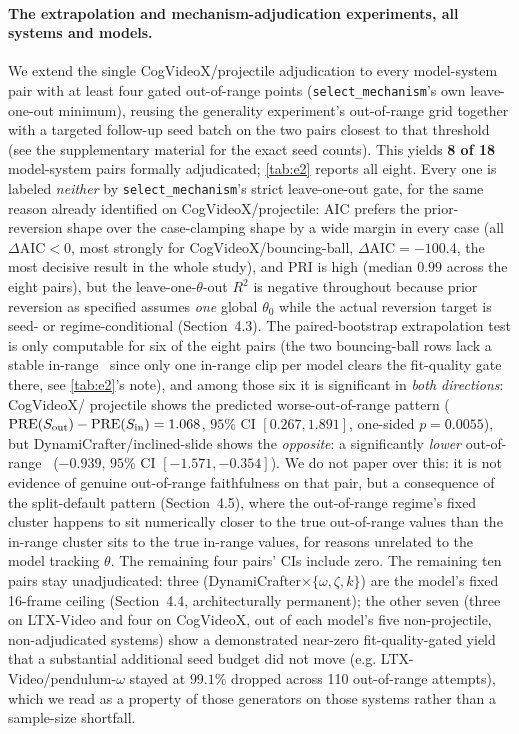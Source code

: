 \documentclass[10pt,twocolumn,letterpaper]{article}
\begin{document}
\paragraph{The extrapolation and mechanism-adjudication experiments, all systems and
models.}
We extend the single CogVideoX/projectile adjudication to every model-system
pair with at least four gated out-of-range points (\texttt{select\_mechanism}'s
own leave-one-out minimum), reusing the generality experiment's out-of-range grid together with a
targeted follow-up seed batch on the two pairs closest to that threshold
(see the supplementary material for the exact seed counts). This yields
\textbf{8 of 18} model-system pairs formally adjudicated; \autoref{tab:e2}
reports all eight. Every one is labeled \emph{neither} by
\texttt{select\_mechanism}'s strict leave-one-out gate, for the same reason
already identified on CogVideoX/projectile: AIC prefers the prior-reversion
shape over the case-clamping shape by a wide margin in every case (all
$\Delta\mathrm{AIC}<0$, most strongly for CogVideoX/bouncing-ball,
$\Delta\mathrm{AIC}=-100.4$, the most decisive result in the whole study),
and PRI is high (median $0.99$ across the eight pairs), but the
leave-one-$\theta$-out $R^2$ is negative throughout because prior reversion as specified
assumes \emph{one} global $\theta_0$ while the actual reversion target is
seed- or regime-conditional (Section~4.3). The paired-bootstrap
extrapolation test is only computable for six of the eight pairs (the two
bouncing-ball rows lack a stable in-range \PRE\ since only one in-range clip
per model clears the fit-quality gate there, see \autoref{tab:e2}'s note),
and among those six it is significant in \emph{both directions}: CogVideoX/
projectile shows the predicted worse-out-of-range pattern
($\mathrm{PRE}(S_\text{out})-\mathrm{PRE}(S_\text{in})=1.068$, $95\%$ CI $[0.267,1.891]$,
one-sided $p=0.0055$), but DynamiCrafter/inclined-slide shows the
\emph{opposite}: a significantly \emph{lower} out-of-range \PRE\
($-0.939$, $95\%$ CI $[-1.571,-0.354]$). We do not paper over this: it is
not evidence of genuine out-of-range faithfulness on that pair, but a
consequence of the split-default pattern (Section~4.5), where the
out-of-range regime's fixed cluster happens to sit numerically closer to
the true out-of-range values than the in-range cluster sits to the true
in-range values, for reasons unrelated to the model tracking $\theta$. The
remaining four pairs' CIs include zero. The remaining
ten pairs stay unadjudicated: three (DynamiCrafter$\times\{\omega,\zeta,
k\}$) are the model's fixed 16-frame ceiling (Section~4.4, architecturally
permanent); the other seven (three on LTX-Video and four on CogVideoX, out
of each model's five non-projectile, non-adjudicated systems) show a demonstrated
near-zero fit-quality-gated yield that a substantial additional seed budget
did not move (e.g. LTX-Video/pendulum-$\omega$ stayed at $99.1\%$ dropped
across 110 out-of-range attempts), which we read as a property of those
generators on those systems rather than a sample-size shortfall.
\end{document}
